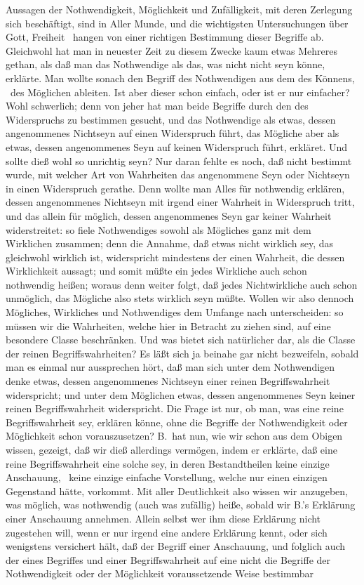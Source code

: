 \gliederungslinie\par
Aussagen der Nothwendigkeit, Möglichkeit und Zufälligkeit, mit deren Zerlegung sich  beschäftigt, sind in Aller Munde, und die wichtigsten Untersuchungen über Gott, Freiheit \umA\ hangen von einer richtigen Bestimmung dieser Begriffe ab. Gleichwohl hat man in neuester Zeit zu diesem Zwecke kaum etwas Mehreres gethan, als daß man das Nothwendige als das, was nicht nicht seyn könne, erklärte. Man wollte sonach den Begriff des Nothwendigen aus dem des Könnens, \dh\  des Möglichen ableiten. Ist aber dieser schon einfach, oder ist er nur einfacher? Wohl schwerlich; denn von jeher hat man beide Begriffe durch den des Widerspruchs zu bestimmen gesucht, und das Nothwendige als etwas, dessen angenommenes Nichtseyn auf einen Widerspruch führt, das Mögliche aber als etwas, dessen angenommenes Seyn auf keinen Widerspruch führt, erkläret. Und sollte dieß wohl so unrichtig seyn? Nur daran fehlte es noch, daß nicht bestimmt wurde, mit welcher Art von Wahrheiten das angenommene Seyn oder Nichtseyn in einen Widerspruch gerathe. Denn wollte man Alles für nothwendig erklären, dessen angenommenes Nichtseyn mit irgend einer Wahrheit in Widerspruch tritt, und das allein  für möglich, dessen angenommenes Seyn gar keiner Wahrheit widerstreitet: so fiele Nothwendiges sowohl als Mögliches ganz mit dem Wirklichen zusammen; denn die Annahme, daß etwas nicht wirklich sey, das gleichwohl wirklich ist, widerspricht mindestens der einen Wahrheit, die dessen Wirklichkeit aussagt; und somit müßte ein jedes Wirkliche auch schon nothwendig heißen; woraus denn weiter folgt, daß jedes Nichtwirkliche auch schon unmöglich, das Mögliche also stets wirklich seyn müßte. Wollen wir also dennoch Mögliches, Wirkliches und Nothwendiges dem Umfange nach unterscheiden: so müssen wir die Wahrheiten, welche hier in Betracht zu ziehen sind, auf eine besondere Classe beschränken. Und was bietet sich natürlicher dar, als die Classe der reinen Begriffswahrheiten? Es läßt sich ja beinahe gar nicht bezweifeln, sobald man es einmal nur aussprechen hört, daß man sich unter dem Nothwendigen denke etwas, dessen angenommenes Nichtseyn einer reinen Begriffswahrheit widerspricht; und unter dem Möglichen etwas, dessen angenommenes Seyn keiner reinen Begriffswahrheit widerspricht. Die Frage ist nur, ob man, was eine reine Begriffswahrheit sey, erklären könne, ohne die Begriffe der Nothwendigkeit oder Möglichkeit schon vorauszusetzen? B.\ hat nun, wie wir schon aus dem Obigen wissen, gezeigt, daß wir dieß allerdings vermögen, indem er erklärte, daß eine reine Begriffswahrheit eine solche sey, in deren Bestandtheilen keine einzige Anschauung, \dh\  keine einzige einfache Vorstellung, welche nur einen einzigen Gegenstand hätte, vorkommt. Mit aller Deutlichkeit also wissen wir anzugeben, was möglich, was nothwendig (auch was zufällig) heiße, sobald wir B.'s Erklärung einer Anschauung annehmen. Allein selbst wer ihm diese Erklärung nicht zugestehen will, wenn er nur irgend eine andere Erklärung kennt, oder sich wenigstens versichert hält, daß der Begriff einer Anschauung, und folglich auch der eines Begriffes und einer Begriffswahrheit auf eine nicht die Begriffe der Nothwendigkeit oder der Möglichkeit voraussetzende Weise bestimmbar 